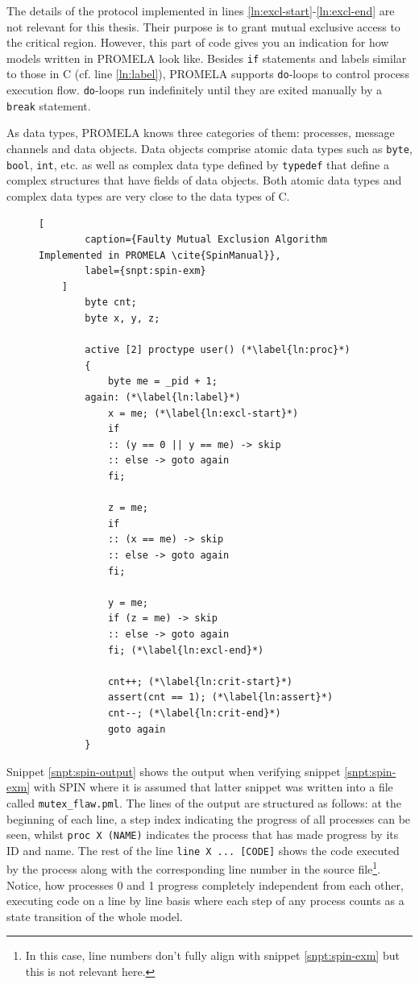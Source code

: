 The details of the protocol implemented in lines \ref{ln:excl-start}-\ref{ln:excl-end} are not relevant for this thesis.
Their purpose is to grant mutual exclusive access to the critical region.
However, this part of code gives you an indication for how models written in PROMELA look like.
Besides \lstinline{if} statements and labels similar to those in C (cf. line \ref{ln:label}), PROMELA supports \lstinline{do}-loops to control process execution flow.
\lstinline{do}-loops run indefinitely until they are exited manually by a \lstinline{break} statement.

As data types, PROMELA knows three categories of them: processes, message channels and data objects.
Data objects comprise atomic data types such as \lstinline{byte}, \lstinline{bool}, \lstinline{int}, etc. as well as complex data type defined by \lstinline{typedef} that define a complex structures that have fields of data objects.
Both atomic data types and complex data types are very close to the data types of C.

\begin{figure}
    \begin{lstlisting}[
        caption={Faulty Mutual Exclusion Algorithm Implemented in PROMELA \cite{SpinManual}},
        label={snpt:spin-exm}
    ]
        byte cnt;
        byte x, y, z;

        active [2] proctype user() (*\label{ln:proc}*)
        {
            byte me = _pid + 1;
        again: (*\label{ln:label}*)
            x = me; (*\label{ln:excl-start}*)
            if
            :: (y == 0 || y == me) -> skip
            :: else -> goto again
            fi;

            z = me;
            if
            :: (x == me) -> skip
            :: else -> goto again
            fi;

            y = me;
            if (z = me) -> skip
            :: else -> goto again
            fi; (*\label{ln:excl-end}*)

            cnt++; (*\label{ln:crit-start}*)
            assert(cnt == 1); (*\label{ln:assert}*)
            cnt--; (*\label{ln:crit-end}*)
            goto again
        }
    \end{lstlisting}
\end{figure}

Snippet \ref{snpt:spin-output} shows the output when verifying snippet \ref{snpt:spin-exm} with SPIN where it is assumed that latter snippet was written into a file called \lstinline{mutex_flaw.pml}.
The lines of the output are structured as follows: at the beginning of each line, a step index indicating the progress of all processes can be seen, whilst \lstinline{proc X (NAME)} indicates the process that has made progress by its ID and name.
The rest of the line \lstinline{line X ... [CODE]} shows the code executed by the process along with the corresponding line number in the source file\footnote{%
    In this case, line numbers don't fully align with snippet \ref{snpt:spin-exm} but this is not relevant here.
}.
Notice, how processes 0 and 1 progress completely independent from each other, executing code on a line by line basis where each step of any process counts as a state transition of the whole model.

